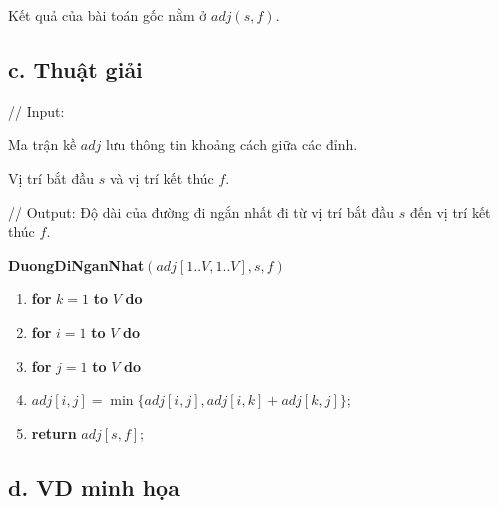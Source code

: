 \documentclass[12pt, a4paper, fleqn]{article}
\begin{document}
	Kết quả của bài toán gốc nằm ở $adj(s, f)$.
	
	\subsection*{c. Thuật giải}
	
	// Input:
	
	Ma trận kề $adj$ lưu thông tin khoảng cách giữa các đỉnh.
	
	Vị trí bắt đầu $s$ và vị trí kết thúc $f$.
	
	// Output: Độ dài của đường đi ngắn nhất đi từ vị trí bắt đầu $s$ đến vị trí kết thúc $f$.
	
	\textbf{DuongDiNganNhat}$(adj[1..V, 1..V], s, f)$
	\begin{enumerate}
		\item \textbf{for} $k = 1$ \textbf{to} $V$ \textbf{do}
		\item \qquad \textbf{for} $i = 1$ \textbf{to} $V$ \textbf{do}
		\item \qquad \qquad \textbf{for} $j = 1$ \textbf{to} $V$ \textbf{do}
		\item \qquad \qquad \qquad $adj[i, j] = \min\{adj[i, j], adj[i, k] + adj[k, j]\}$;
		\item \textbf{return} $adj[s, f]$;
	\end{enumerate}
	
	\subsection*{d. VD minh họa}
	
\end{document}
